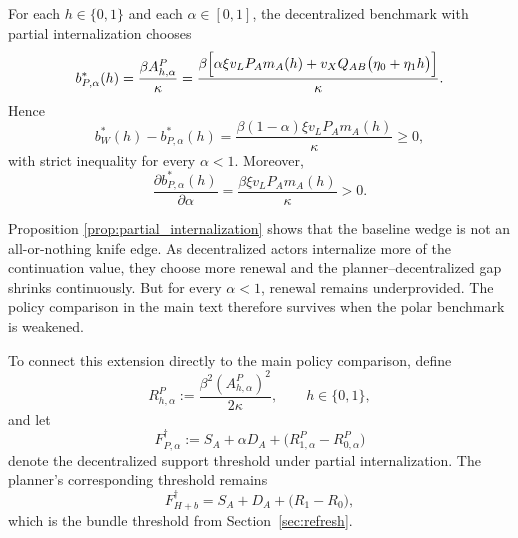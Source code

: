 \begin{proposition}
\label{prop:partial_internalization}
For each $h\in\{0,1\}$ and each $\alpha\in[0,1]$, the decentralized benchmark with partial internalization chooses
\begin{equation}
b_{P,\alpha}^*(h)
=
\frac{\beta A_{h,\alpha}^P}{\kappa}
=
\frac{\beta\Bigl[\alpha\xi v_LP_Am_A(h)+v_XQ_{AB}\bigl(\eta_0+\eta_1 h\bigr)\Bigr]}{\kappa}.
\label{eq:bPalpha}
\end{equation}
Hence
\begin{equation}
b_W^*(h)-b_{P,\alpha}^*(h)
=
\frac{\beta(1-\alpha)\xi v_LP_Am_A(h)}{\kappa}
\ge 0,
\label{eq:b_gap_alpha}
\end{equation}
with strict inequality for every $\alpha<1$. Moreover,
\begin{equation}
\frac{\partial b_{P,\alpha}^*(h)}{\partial \alpha}
=
\frac{\beta\xi v_LP_Am_A(h)}{\kappa}
>0.
\label{eq:dbdalpha}
\end{equation}
\end{proposition}

Proposition \ref{prop:partial_internalization} shows that the baseline wedge is not an all-or-nothing knife edge. As decentralized actors internalize more of the continuation value, they choose more renewal and the planner--decentralized gap shrinks continuously. But for every $\alpha<1$, renewal remains underprovided. The policy comparison in the main text therefore survives when the polar benchmark is weakened.

To connect this extension directly to the main policy comparison, define
\begin{equation}
R_{h,\alpha}^P
:=
\frac{\beta^2(A_{h,\alpha}^P)^2}{2\kappa},
\qquad
h\in\{0,1\},
\label{eq:Rhalpha}
\end{equation}
and let
\begin{equation}
F_{P,\alpha}^{\dagger}
:=
S_A+\alpha D_A+\bigl(R_{1,\alpha}^P-R_{0,\alpha}^P\bigr)
\label{eq:FPalpha_dagger}
\end{equation}
denote the decentralized support threshold under partial internalization. The planner's corresponding threshold remains
\begin{equation}
F_{H+b}^{\dagger}
=
S_A+D_A+\bigl(R_1-R_0\bigr),
\label{eq:FW_dagger_alpha}
\end{equation}
which is the bundle threshold from Section~\ref{sec:refresh}.

